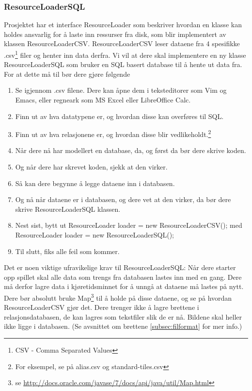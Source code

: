 \documentclass[norsk]{article}
\begin{document}
\subsubsection{ResourceLoaderSQL}
\label{subsec:resourceloadersql}
Prosjektet har et interface ResourceLoader som beskriver hvordan en klasse kan holdes ansvarlig for å laste inn ressurser fra disk,
som blir implementert av klassen ResourceLoaderCSV.
ResourceLoaderCSV leser dataene fra 4 spesifikke .csv\footnote{CSV - Comma Separated Values} filer og henter inn data derfra.
Vi vil at dere skal implementere en ny klasse ResourceLoaderSQL som bruker en SQL basert database til å hente ut data fra.
For at dette må til bør dere gjøre følgende
\begin{enumerate}
\item Se igjennom .csv filene. Dere kan åpne dem i teksteditorer som Vim og Emacs, eller regneark som MS Excel eller LibreOffice Calc.
\item Finn ut av hva datatypene er, og hvordan disse kan overføres til SQL.
\item Finn ut av hva relasjonene er, og hvordan disse blir vedlikeholdt.\footnote{For eksempel, se på alias.csv og standard-tiles.csv}
\item Når dere nå har modellert en database, da, og først da bør dere skrive koden.
\item Og når dere har skrevet koden, sjekk at den virker.
\item Så kan dere begynne å legge dataene inn i databasen.
\item Og nå når dataene er i databasen, og dere vet at den virker, da bør dere skrive ResourceLoaderSQL klassen.
\item Nest sist, bytt ut ResourceLoader loader = new ResourceLoaderCSV(); med ResourceLoader loader = new ResourceLoaderSQL();
\item Til slutt, fiks alle feil som kommer.
\end{enumerate}

Det er noen viktige ufravikelige krav til ResourceLoaderSQL:
Når dere starter opp spillet skal alle data som trengs fra databasen lastes inn med en gang.
Dere må derfor lagre data i kjøretidsminnet for å unngå at dataene må lastes på nytt.
Dere bør absolutt bruke Map\footnote{se \url{http://docs.oracle.com/javase/7/docs/api/java/util/Map.html}} til å holde på disse dataene, og se på hvordan ResourceLoaderCSV gjør det.
Dere trenger ikke å lagre brettene i relasjonsdatabasen, de kan lagres som tekstfiler slik de er nå. Bildene skal heller ikke ligge i databasen. (Se avsnittet om brettene \ref{subsec:filformat} for mer info.)
\end{document}
